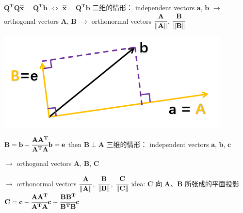 \documentclass[12pt, a4paper]{article}
\begin{document}
{\par ${\mathbf{Q^{T}}}{\mathbf{Q}}{\mathbf{\hat{x}}} = {\mathbf{Q^{T}}}{\mathbf{b}}$ $\Longleftrightarrow$ ${\mathbf{\hat{x}}} = {\mathbf{Q^{T}}}{\mathbf{b}}$
\vspace{31pt}
\newline
二维的情形：
\newline
independent vectors ${\mathbf{a}}$, ${\mathbf{b}}$ $\longrightarrow$ orthogonal vectors ${\mathbf{A}}$, ${\mathbf{B}}$ $\longrightarrow$ orthonormal vectors $\cfrac{\mathbf{A}}{\Vert{\mathbf{A}}\Vert}$, $\cfrac{\mathbf{B}}{\Vert{\mathbf{B}}\Vert}$
\begin{center}
	\includegraphics[scale=0.8]{figures/S17-1.png}
\end{center}
\begin{math}
	{\mathbf{B}} = {\mathbf{b}} - \cfrac{{\mathbf{A}}{\mathbf{A^{T}}}}{{\mathbf{A^{T}}}{\mathbf{A}}}{\mathbf{b}} = {\mathbf{e}}
\end{math}
\qquad then ${\mathbf{B}} \perp {\mathbf{A}}$
\vspace{14pt}
\newline
三维的情形：
\newline
independent vectors ${\mathbf{a}}$, ${\mathbf{b}}$, ${\mathbf{c}}$
\par\quad $\longrightarrow$ orthogonal vectors ${\mathbf{A}}$, ${\mathbf{B}}$, ${\mathbf{C}}$
\par\qquad\qquad $\longrightarrow$ orthonormal vectors $\cfrac{\mathbf{A}}{\Vert{\mathbf{A}}\Vert}$, $\cfrac{\mathbf{B}}{\Vert{\mathbf{B}}\Vert}$, $\cfrac{\mathbf{C}}{\Vert{\mathbf{C}}\Vert}$
\newline
idea: ${\mathbf{C}}$ 向 ${\mathbf{A}}$、${\mathbf{B}}$ 所张成的平面投影
\newline
\begin{math}
	{\mathbf{C}} = {\mathbf{c}} - \cfrac{{\mathbf{A}}{\mathbf{A^{T}}}}{{\mathbf{A^{T}}}{\mathbf{A}}}{\mathbf{c}} - \cfrac{{\mathbf{B}}{\mathbf{B^{T}}}}{{\mathbf{B^{T}}}{\mathbf{B}}}{\mathbf{c}}
\end{math}
}
\end{document}
